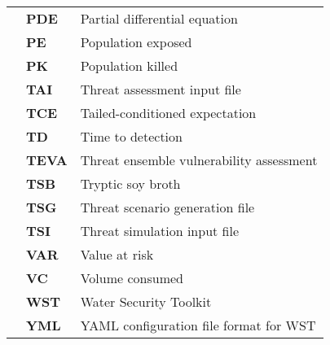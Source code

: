 \begin{tabularx}{\textwidth}{p{0.5in}lX}
&\bf PDE & Partial differential equation \\
&\bf PE & Population exposed \\
&\bf PK & Population killed \\
&\bf TAI & Threat assessment input file \\
&\bf TCE & Tailed-conditioned expectation \\
&\bf TD & Time to detection \\
&\bf TEVA & Threat ensemble vulnerability assessment \\
&\bf TSB & Tryptic soy broth\\
&\bf TSG & Threat scenario generation file\\
&\bf TSI & Threat simulation input file\\
&\bf VAR & Value at risk \\
&\bf VC & Volume consumed \\
&\bf WST & Water Security Toolkit \\
&\bf YML & YAML configuration file format for WST \\
\end{tabularx}
